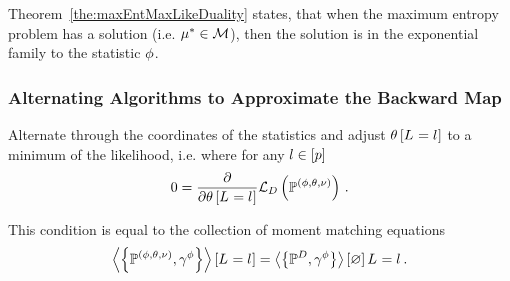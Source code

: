 %
Theorem~\ref{the:maxEntMaxLikeDuality} states, that when the maximum entropy problem has a solution (i.e. $\mu^*\in\mathcal{M}$), then the solution is in the exponential family to the statistic $\phi$.


\subsubsection{Alternating Algorithms to Approximate the Backward Map}\label{sec:alternatingBackwardMap}




Alternate through the coordinates of the statistics and adjust $\theta\left[L_{}=l_{}\right]$ to a minimum of the likelihood, i.e. where for any $l\in[p]$
\begin{align*}
	0 = \frac{\partial}{\partial \theta\left[L_{}=l_{}\right]} \mathcal{L}_{D}\left(\mathbb{P}^{(\phi,\theta,\nu)}\right) \, . 
\end{align*}

This condition is equal to the collection of moment matching equations %
\begin{align*}
	\left\langle \left\{\mathbb{P}^{(\phi,\theta,\nu)},\gamma^{\phi}\right\}\right\rangle \left[ L_{}=l_{} \right] = \left\langle \left\{\mathbb{P}^{D},\gamma^{\phi}\right\}\right\rangle \left[ \varnothing \right]{L_{}=l_{}} \, . 
\end{align*}


